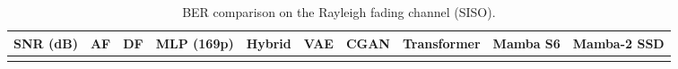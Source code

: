 \begin{longtable}[]{@{}
  >{\raggedright\arraybackslash}p{}
  >{\raggedright\arraybackslash}p{}
  >{\raggedright\arraybackslash}p{}
  >{\raggedright\arraybackslash}p{}
  >{\raggedright\arraybackslash}p{}
  >{\raggedright\arraybackslash}p{}
  >{\raggedright\arraybackslash}p{}
  >{\raggedright\arraybackslash}p{}
  >{\raggedright\arraybackslash}p{}
  >{\raggedright\arraybackslash}p{}@{}}
\caption{BER comparison on the Rayleigh fading channel (SISO).}\label{tbl:table2}\tabularnewline
\toprule\noalign{}
\begin{minipage}[b]{\linewidth}\raggedright
SNR (dB)
\end{minipage} & \begin{minipage}[b]{\linewidth}\raggedright
AF
\end{minipage} & \begin{minipage}[b]{\linewidth}\raggedright
DF
\end{minipage} & \begin{minipage}[b]{\linewidth}\raggedright
MLP (169p)
\end{minipage} & \begin{minipage}[b]{\linewidth}\raggedright
Hybrid
\end{minipage} & \begin{minipage}[b]{\linewidth}\raggedright
VAE
\end{minipage} & \begin{minipage}[b]{\linewidth}\raggedright
CGAN
\end{minipage} & \begin{minipage}[b]{\linewidth}\raggedright
Transformer
\end{minipage} & \begin{minipage}[b]{\linewidth}\raggedright
Mamba S6
\end{minipage} & \begin{minipage}[b]{\linewidth}\raggedright
Mamba-2 SSD
\end{minipage} \\
\midrule\noalign{}
\endfirsthead
\toprule\noalign{}
\begin{minipage}[b]{\linewidth}\raggedright

\end{minipage}
\end{longtable}
